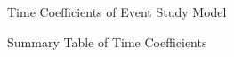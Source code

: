 \documentclass[
  12pt]{article}
\begin{document}
\begin{figure}


\caption{\label{fig-time}Time Coefficients of Event Study Model}

\end{figure}%

\begin{figure}


\caption{\label{fig-SummaryTable}Summary Table of Time Coefficients}

\end{figure}%
\end{document}
